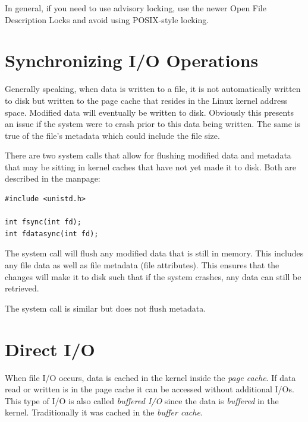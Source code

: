 In general, if you need to use advisory locking, use the newer Open File Description Locks and avoid using POSIX-style locking.


\section{Synchronizing I/O Operations}

Generally speaking, when data is written to a file, it is not automatically written to disk but written to the page cache that resides in the Linux kernel address space. Modified data will eventually be written to disk. Obviously this presents an issue if the system were to crash prior to this data being written. The same is true of the file's metadata which could include the file size.

There are two system calls that allow for flushing modified data and metadata that may be sitting in kernel caches that have not yet made it to disk. Both are described in the  manpage:

\begin{lstlisting}
#include <unistd.h>

int fsync(int fd);
int fdatasync(int fd);
\end{lstlisting}

\noindent
The  system call will flush any modified data that is still in memory. This includes any file data as well as file metadata (file attributes). This ensures that the changes will make it to disk such that if the system crashes, any data can still be retrieved.

The   system call is similar but does not flush metadata. 


\section{Direct I/O}


When file I/O occurs, data is cached in the kernel inside the \textit{page cache}. If data read or written is in the page cache it can be accessed without additional I/Os. This type of I/O is also called \textit{buffered I/O} since the data is \textit{buffered} in the kernel. Traditionally it was cached in the \textit{buffer cache}. 

